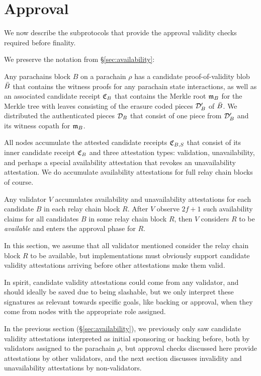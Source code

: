 

\section{Approval} %
\label{sec:approval}

We now describe the subprotocols that provide the approval validity checks required before finality.  


We preserve the notation from \S\ref{sec:availability}:  

Any parachains block $B$ on a parachain $\rho$ has a candidate proof-of-validity blob $\bar{B}$ that contains the witness proofs for any parachain state interactions, as well as an associated candidate receipt $\mathfrak{C}_B$ that contains the Merkle root $\mathfrak{m}_B$ for the Merkle tree with leaves consisting of the erasure coded pieces $\mathcal{D}'_B$ of $\bar{B}$.  We distributed the authenticated pieces $\mathcal{D}_B$ that consist of one piece from $\mathcal{D}'_B$ and its witness copath for $\mathfrak{m}_B$.  

All nodes accumulate the attested candidate receipts $\mathfrak{C}_{B,S}$ that consist of its inner candidate receipt $\mathfrak{C}_B$ and three attestation types: validation, unavailability, and perhaps a special availability attestation that revokes an unavailability attestation.  We do accumulate availability attestations for full relay chain blocks of course.

Any validator $V$ accumulates availability and unavailability attestations for each candidate $B$ in each relay chain block $R$.  After $V$ observe $2f+1$ such availability claims for all candidates $B$ in some relay chain block $R$, then $V$ considers $R$ to be {\em available} and enters the approval phase for $R$.  

In this section, we assume that all validator mentioned consider the relay chain block $R$ to be available, but implementations must obviously support candidate validity attestations arriving before other attestations make them valid. 

In spirit, candidate validity attestations could come from any validator, and should ideally be saved due to being slashable, but we only interpret these signatures as relevant towards specific goals, like backing or approval, when they come from nodes with the appropriate role assigned.

In the previous section (\S\ref{sec:availability}), we previously only saw candidate validity attestations interpreted as initial sponsoring or backing before, both by validators assigned to the parachain $\rho$, but approval checks discussed here provide attestations by other validators, and the next section discusses invalidity and unavailability attestations by non-validators.


